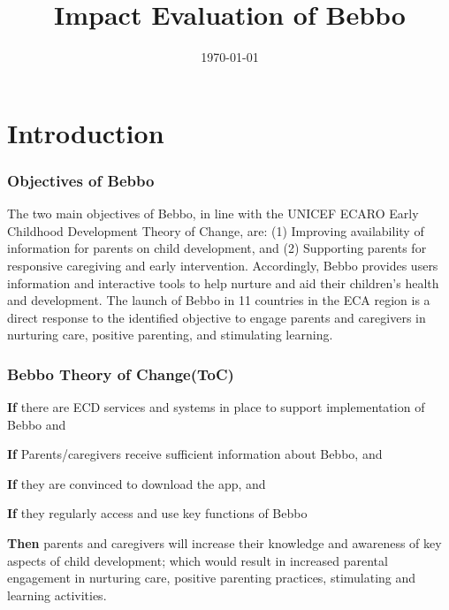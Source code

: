 \documentclass[aspectratio=169]{beamer}
\title[title]{Impact Evaluation of Bebbo}
\date[\today] {\today} %
\begin{document}
\begin{frame}
\titlepage
\end{frame}



\section{Introduction}

\begin{frame}
  \frametitle{Objectives of Bebbo}

The two main objectives of Bebbo, in line with the UNICEF ECARO Early Childhood Development Theory of Change, are: (1) Improving availability of information for parents on child development, and (2) Supporting parents for responsive caregiving and early intervention. Accordingly, Bebbo provides users information and interactive tools to help nurture and aid their children’s health and development. The launch of Bebbo in 11 countries in the ECA region is a direct response to the identified objective to engage parents and caregivers in nurturing care, positive parenting, and stimulating learning. 

\end{frame}

\begin{frame}
\frametitle{Bebbo Theory of Change(ToC)}
\textbf{If} there are ECD services and systems in place to support implementation of Bebbo and
 
\textbf{If} Parents/caregivers receive sufficient information about Bebbo, and 

\textbf{If} they are convinced to download the app, and  

\textbf{If} they regularly access and use key functions of Bebbo 

\textbf{Then} parents and caregivers will increase their knowledge and awareness of key aspects of child development; which would result in increased parental engagement in nurturing care, positive parenting practices, stimulating and learning activities. 

\end{frame}
\end{document}
